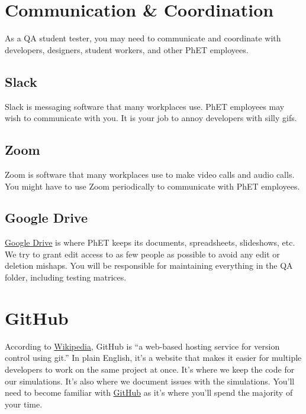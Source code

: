 \documentclass[titlepage]{article}
\begin{document}
\pagebreak


\section{Communication \& Coordination}

As a QA student tester, you may need to communicate and coordinate with developers, designers, student workers, and other PhET employees.

	\subsection{Slack}

Slack is messaging software that many workplaces use. PhET employees may wish to communicate with you. It is your job to annoy developers with silly gifs.
	\subsection{Zoom}

Zoom is software that many workplaces use to make video calls and audio calls. You might have to use Zoom periodically to communicate with PhET employees.

	\subsection{Google Drive}

\href{https://www.google.com/drive/}{Google Drive} is where PhET keeps its documents, spreadsheets, slideshows, etc. We try to grant edit access to as few people as possible to avoid any edit or deletion mishaps. You will be responsible for maintaining everything in the QA folder, including testing matrices.

\pagebreak


\section{GitHub}

According to \href{https://en.wikipedia.org/wiki/GitHub}{Wikipedia}, GitHub is ``a web-based hosting service for version control using git.'' In plain English, it's a website that makes it easier for multiple developers to work on the same project at once. It's where we keep the code for our simulations. It's also where we document issues with the simulations. You'll need to become familiar with \href{https://github.com/phetsims}{GitHub} as it's where you'll spend the majority of your time.
\end{document}
